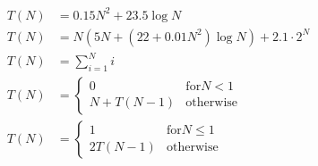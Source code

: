 \documentclass[a4paper]{article}
\begin{document}
\begin{align}
  T(N) &= 0.15 N^2 + 23.5 \log N
  \\
  T(N) &= N (5N + (22 + 0.01N^2) \log N) + 2.1 \cdot 2^N
  \\
  T(N) &= \sum_{i=1}^Ni
  \\
  T(N) &=
  \begin{cases}
    0          & \text{for} N < 1 \\
    N + T(N-1) & \text{otherwise}
  \end{cases}
  \\
  T(N) &=
  \begin{cases}
    1        & \text{for} N \leq 1 \\
    2 T(N-1) & \text{otherwise}
  \end{cases}
\end{align}
\end{document}
